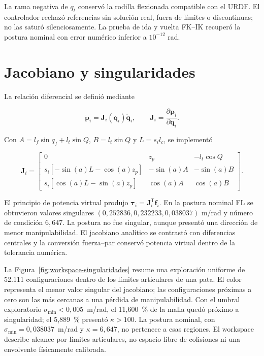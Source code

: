 La rama negativa de $q_t$ conservó la rodilla flexionada compatible con el
URDF. El controlador rechazó referencias sin solución real, fuera de límites o
discontinuas; no las saturó silenciosamente. La prueba de ida y vuelta FK--IK
recuperó la postura nominal con error numérico inferior a $10^{-12}$ rad.

\section{Jacobiano y singularidades}

La relación diferencial se definió mediante

\begin{equation}
\dot{\mathbf p}_i=\mathbf J_i(\mathbf q_i)\dot{\mathbf q}_i,
\qquad
\mathbf J_i=\frac{\partial\mathbf p_i}{\partial\mathbf q_i}.
\label{eq:nova-jacobian-definition}
\end{equation}

Con $A=l_f\sin q_f+l_t\sin Q$, $B=l_t\sin Q$ y $L=s_il_c$, se implementó

\begin{equation}
\mathbf J_i=
\begin{bmatrix}
0&z_p&-l_t\cos Q\\
s_i[-\sin(a)L-\cos(a)z_p]&-\sin(a)A&-\sin(a)B\\
s_i[\cos(a)L-\sin(a)z_p]&\cos(a)A&\cos(a)B
\end{bmatrix}.
\label{eq:nova-jacobian}
\end{equation}

El principio de potencia virtual produjo
$\boldsymbol\tau_i=\mathbf J_i^{\mathsf T}\mathbf f_i$. En la postura nominal
FL se obtuvieron valores singulares
$(0,252836,0,232233,0,038037)$ m/rad y número de condición $6,647$. La postura
no fue singular, aunque presentó una dirección de menor manipulabilidad. El
jacobiano analítico se contrastó con diferencias centrales y la conversión
fuerza--par conservó potencia virtual dentro de la tolerancia numérica.

La Figura~\ref{fig:workspace-singularidades} resume una exploración uniforme
de 52.111 configuraciones dentro de los límites articulares de una pata. El
color representa el menor valor singular del jacobiano; las configuraciones
próximas a cero son las más cercanas a una pérdida de manipulabilidad. Con el
umbral exploratorio $\sigma_{\min}<0{,}005$~m/rad, el 11,600~\% de la malla
quedó próximo a singularidad; el 5,889~\% presentó $\kappa>100$. La postura
nominal, con $\sigma_{\min}=0{,}038037$~m/rad y $\kappa=6{,}647$, no pertenece
a esas regiones. El workspace describe alcance por límites articulares, no
espacio libre de colisiones ni una envolvente físicamente calibrada.

